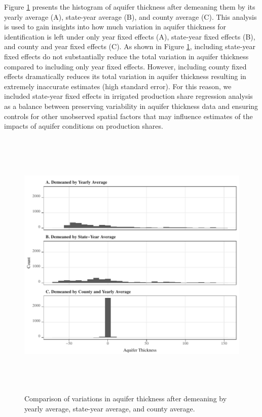\documentclass[
]{article}
\begin{document}
Figure \ref{fig:variation-left} presents the histogram of aquifer thickness after demeaning them by its yearly average (A), state-year average (B), and county average (C). This analysis is used to gain insights into how much variation in aquifer thickness for identification is left under only year fixed effects (A), state-year fixed effects (B), and county and year fixed effects (C). As shown in Figure \ref{fig:variation-left}, including state-year fixed effects do not substantially reduce the total variation in aquifer thickness compared to including only year fixed effects. However, including county fixed effects dramatically reduces its total variation in aquifer thickness resulting in extremely inaccurate estimates (high standard error). For this reason, we included state-year fixed effects in irrigated production share regression analysis as a balance between preserving variability in aquifer thickness data and ensuring controls for other unobserved spatial factors that may influence estimates of the impacts of aquifer conditions on production shares. 

\begin{figure}[H]

{\centering \includegraphics[width=6in,height=500px,]{../../Figures/g_variation} 

}

\caption{Comparison of variations in aquifer thickness after demeaning by yearly average, state-year average, and county average.}\label{fig:variation-left}
\end{figure}
\end{document}
